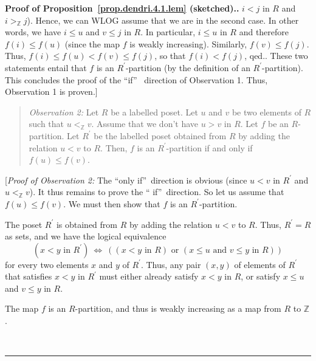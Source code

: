 \documentclass[numbers=enddot,12pt,final,onecolumn,notitlepage]{scrartcl}%
\theoremstyle{definition}
\newenvironment{statement}{\begin{quote}}{\end{quote}}
\newenvironment{proof}[1][Proof]{\noindent\textbf{#1.} }{\ \rule{0.5em}{0.5em}}
\newenvironment{verlong}{}{}
\newcommand{\ZZ}{\mathbb{Z}}
\begin{document}
\begin{verlong}
\begin{proof}[Proof of Proposition~\ref{prop.dendri.4.1.lem} (sketched).]
{$i<j$ in $R$ and $i>_{\mathbb{Z}}j$). Hence, we can WLOG assume that we are in
the second case. In other words, we have $i\leq u$ and $v\leq j$ in $R$. In
particular, $i\leq u$ in $R$ and therefore $f\left(  i\right)  \leq f\left(
u\right)  $ (since the map $f$ is weakly increasing). Similarly, $f\left(
v\right)  \leq f\left(  j\right)  $. Thus, $f\left(  i\right)  \leq f\left(
u\right)  <f\left(  v\right)  \leq f\left(  j\right)  $, so that $f\left(
i\right)  <f\left(  j\right)  $, qed.}. These two statements entail that $f$
is an $R^{\prime}$-partition (by the definition of an $R^{\prime}$-partition).
This concludes the proof of the \textquotedblleft if\textquotedblright%
\ direction of Observation 1. Thus, Observation 1 is proven.]

\begin{statement}
\textit{Observation 2:} Let $R$ be a labelled poset. Let $u$ and $v$ be
two elements of $R$ such that $u <_{\ZZ} v$.
Assume that we don't have $u > v$ in $R$.
Let $f$ be an $R$-partition.
Let $R^{\prime}$ be the labelled poset obtained from $R$ by adding the
relation $u < v$ to $R$.
Then, $f$ is an $R^{\prime}$-partition if and only if
$f \left(u\right) \leq f\left(v\right)$.
\end{statement}

[\textit{Proof of Observation 2:} The \textquotedblleft only
if\textquotedblright\ direction is obvious (since $u<v$ in $R^{\prime}$ and
$u<_{\mathbb{Z}}v$). It thus remains to prove the \textquotedblleft
if\textquotedblright\ direction. So let us assume that $f\left(  u\right)
\leq f\left(  v\right)  $. We must then show that $f$ is an $R^{\prime}$-partition.

The poset $R^{\prime}$ is obtained from $R$ by adding the relation $u<v$ to
$R$. Thus, $R^{\prime}=R$ as sets, and we have the logical equivalence%
\[
\left(  x<y\text{ in }R^{\prime}\right)  \ \Longleftrightarrow\ \left(
\left(  x<y\text{ in }R\right)  \text{ or }\left(  x\leq u\text{ and }v\leq
y\text{ in }R\right)  \right)
\]
for every two elements $x$ and $y$ of $R^{\prime}$. Thus, any pair $\left(
x,y\right)  $ of elements of $R^{\prime}$ that satisfies $x<y$ in $R^{\prime}$
must either already satisfy $x<y$ in $R$, or satisfy $x\leq u$ and $v\leq y$
in $R$.

The map $f$ is an $R$-partition, and thus is weakly increasing as a map from
$R$ to $\mathbb{Z}$.


\end{proof}
\end{verlong}
\end{document}

